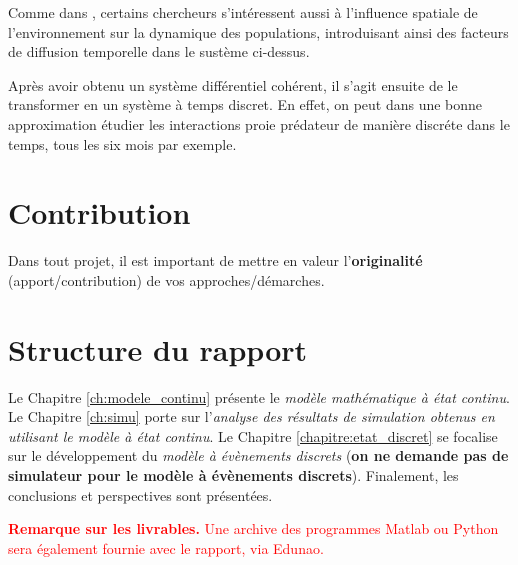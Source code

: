 Comme dans \cite{ProtecZone}, certains chercheurs s'intéressent aussi à l'influence spatiale de l'environnement sur la dynamique des populations, introduisant ainsi des facteurs de diffusion temporelle dans le sustème ci-dessus.

Après avoir obtenu un système différentiel cohérent, il s'agit ensuite de le transformer en un système à temps discret. En effet, on peut dans une bonne approximation étudier les interactions proie prédateur de manière discréte dans le temps, tous les six mois par exemple.

\section{Contribution}
\label{sec:Contribution}

Dans tout projet, il est important de mettre en valeur l’\textbf{originalité} (apport/contribution) de vos approches/démarches.

\section{Structure du rapport}
\label{sec:Structure}

Le Chapitre \ref{ch:modele_continu} présente le \textit{modèle mathématique à état continu}. Le Chapitre \ref{ch:simu} porte sur l’\textit{analyse des résultats de simulation obtenus en utilisant le modèle à état continu}. Le Chapitre \ref{chapitre:etat_discret} se focalise sur le développement du \textit{modèle à évènements discrets} (\textbf{on ne demande pas de simulateur pour le modèle à évènements discrets}). Finalement, les conclusions et perspectives sont présentées.

\textcolor{red}{\textbf{Remarque sur les livrables.} Une archive des programmes Matlab ou Python sera également fournie avec le rapport, via Edunao.}
